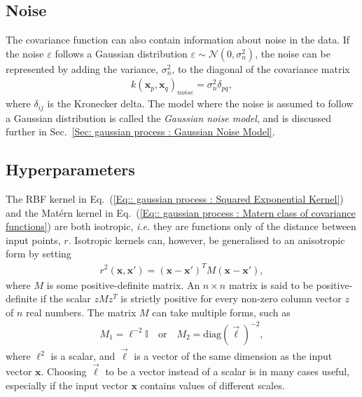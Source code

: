 \documentclass[twoside,english]{uiofysmaster}
\begin{document}
{{\subsection{Noise}\label{Sec:: gaussian process : Noise Covariance Function}


The covariance function can also contain information about noise in the data. If the noise $\varepsilon$ follows a Gaussian distribution $\varepsilon \sim \mathcal{N}(0, \sigma_n^2)$, the noise can be represented by adding the variance, $\sigma_n^2$, to the diagonal of the covariance matrix
\begin{align}
k(\textbf{x}_p, \textbf{x}_q)_{noise} = \sigma^2_n \delta_{pq},
\end{align}
where $\delta_{ij}$ is the Kronecker delta. The model where the noise is assumed to follow a Gaussian distribution is called the \textit{Gaussian noise model}, and is discussed further in Sec.~\ref{Sec: gaussian process : Gaussian Noise Model}. %

\subsection{Hyperparameters}\label{Sec:: gaussian process : Hyperparameters}

The RBF kernel in Eq.~(\ref{Eq:: gaussian process : Squared Exponential Kernel}) and the Mat\'{e}rn kernel in Eq.~(\ref{Eq:: gaussian process : Matern class of covariance functions}) are both isotropic, \textit{i.e.} they are functions only of the distance between input points, $r$. Isotropic kernels can, however, be generalised to an anisotropic form by setting
\begin{align}
r^2(\textbf{x}, \textbf{x}') = (\textbf{x} - \textbf{x}')^T M(\textbf{x} - \textbf{x}'),
\end{align}
where $M$ is some positive-definite matrix. An $n \times n$ matrix is said to be positive-definite if the scalar $zMz^T$ is strictly positive for every non-zero column vector $z$ of $n$ real numbers. The matrix $M$ can take multiple forms, such as 
\begin{align}
M_1 = \ell^{-2} \mathbb{I} \quad \mathrm{or} \quad M_2 = \text{diag}(\vec{\ell})^{-2},
\end{align}
where $\ell^2$ is a scalar, and $\vec{\ell}$ is a vector of the same dimension as the input vector $\textbf{x}$. Choosing $\vec{\ell}$ to be a vector instead of a scalar is in many cases useful, especially if the input vector $\textbf{x}$ contains values of different scales.

}}
\end{document}
